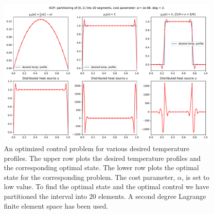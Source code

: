 \begin{figure}
  \centering
  \includegraphics[width=\textwidth]{Images/plots/task2_fig_2.pdf}
  \caption{An optimized control problem for various
    desired temperature profiles. The upper row plots the
    desired temperature profiles and the corresponding 
    optimal state. The lower row plots the
    optimal state for the corresponding problem.
    The cost parameter, $\alpha$, is set to low value.
    To find the optimal state and the optimal control we 
    have partitioned the interval into \( 20 \) elements.
    A second degree Lagrange finite element space has been used.}
  \label{fig:2}
\end{figure}


